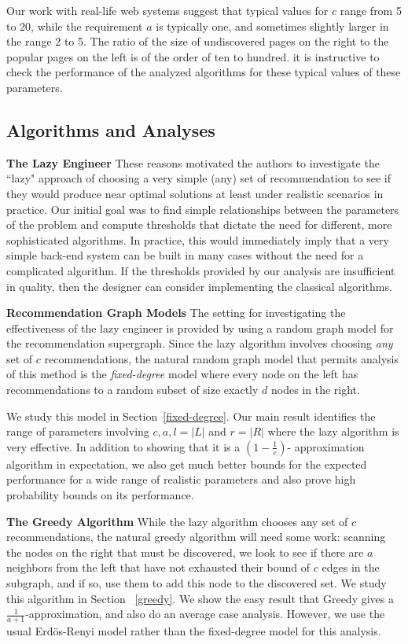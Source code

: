 Our work with real-life web systems suggest that typical values for $c$ range
from 5 to 20, while the requirement $a$ is typically one, and sometimes slightly
larger in the range 2 to 5. The ratio of the size of undiscovered pages on the
right to the popular pages on the left is of the order of ten to hundred. it is
instructive to check the performance of the analyzed algorithms for these
typical values of these parameters.

\subsection{Algorithms and Analyses}

{\bf The Lazy Engineer}
These reasons motivated the authors to investigate the ``lazy" approach of
choosing a very simple (any) set of recommendation to see if they would produce
near optimal solutions at least under realistic scenarios in practice. Our
initial goal was to find simple relationships between the parameters of the
problem and compute thresholds that dictate the need for different, more
sophisticated algorithms. In practice, this would immediately imply that a very
simple back-end system can be built in many cases without the need for a
complicated algorithm. If the thresholds provided by our analysis are
insufficient in quality, then the designer can consider implementing the
classical algorithms. \vs

{\bf Recommendation Graph Models}
The setting for investigating the effectiveness of the lazy engineer is provided
by using a random graph model for the recommendation supergraph. Since the lazy
algorithm involves choosing {\em any} set of $c$ recommendations, the natural
random graph model that permits analysis of this method is the {\em fixed-degree}
model where every node on the left has recommendations to a random subset of size
exactly $d$ nodes in the right. 

We study this model in Section~\ref{fixed-degree}. Our main result identifies
the range of parameters involving $c,a,l=|L|$ and $r =|R|$ where the lazy
algorithm is very effective. In addition to showing that it is a $(1-\frac1e)$-
approximation algorithm in expectation, we also get much better bounds for the
expected performance for a wide range of realistic parameters and also prove
high probability bounds on its performance. \vs

{\bf The Greedy Algorithm}
While the lazy algorithm chooses any set of $c$ recommendations, the natural
greedy algorithm will need some work: scanning the nodes on the right that must
be discovered, we look to see if there are $a$ neighbors from the left that have
not exhausted their bound of $c$ edges in the subgraph, and if so, use them to
add this node to the discovered set. We study this algorithm in Section
~\ref{greedy}. We show the easy result that Greedy gives a 
$\frac{1}{a+1}$-approximation, and also do an average case analysis. However, we
use the usual Erd\"os-Renyi model rather than the fixed-degree model for this
analysis.


